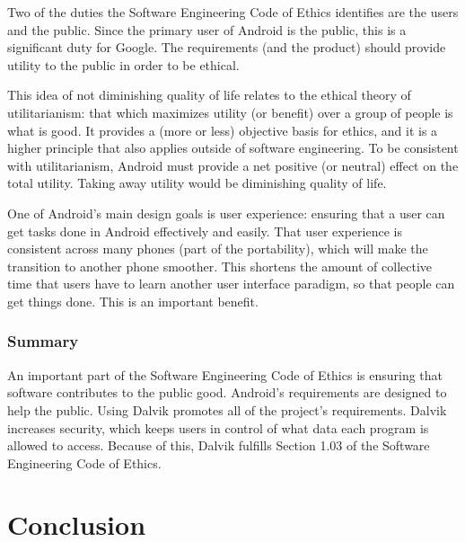\documentclass[11pt]{article}
\begin{document}
\begin{multicols}{2}
Two of the duties the Software Engineering Code of Ethics identifies are the
users and the public.  Since the primary user of Android is the public, this is
a significant duty for Google.  The requirements (and the product) should
provide utility to the public in order to be ethical.

This idea of not diminishing quality of life relates to the ethical theory of
utilitarianism: that which maximizes utility (or benefit) over a group of people
is what is good.  It provides a (more or less) objective basis for ethics, and
it is a higher principle that also applies outside of software engineering.  To
be consistent with utilitarianism, Android must provide a net positive (or
neutral) effect on the total utility.  Taking away utility would be diminishing
quality of life.

One of Android's main design goals is user experience: ensuring that a user can
get tasks done in Android effectively and easily.  That user experience is
consistent across many phones (part of the portability), which will make the
transition to another phone smoother.  This shortens the amount of collective
time that users have to learn another user interface paradigm, so that people
can get things done.  This is an important benefit.


\subsubsection{Summary} %
\label{ssub:public-summary}

An important part of the Software Engineering Code of Ethics is ensuring that
software contributes to the public good.  Android's requirements are designed to
help the public.  Using Dalvik promotes all of the project's requirements.
Dalvik increases security, which keeps users in control of what data each
program is allowed to access.  Because of this, Dalvik fulfills Section 1.03 of
the Software Engineering Code of Ethics.




\section{Conclusion} %
\label{sec:conclusion}


\end{multicols}
\end{document}
